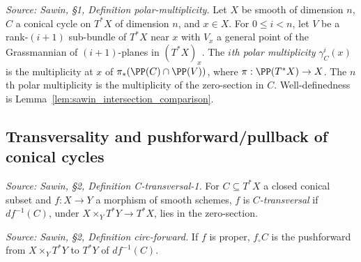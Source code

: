 \begin{definition}
  \label{def:sawin_polar_multiplicity}
  \textit{Source: Sawin, §1, Definition polar-multiplicity.}
  Let $X$ be smooth of dimension $n$, $C$ a conical cycle on $T^*X$ of dimension
  $n$, and $x\in X$.  For $0\le i<n$, let $V$ be a rank-$(i+1)$ sub-bundle of
  $T^*X$ near $x$ with $V_x$ a general point of the Grassmannian of
  $(i+1)$-planes in $(T^*X)_x$.  The \emph{$i$th polar multiplicity}
  $\gamma^i_C(x)$ is the multiplicity at $x$ of $\pi_*(\PP(C)\cap\PP(V))$, where
  $\pi:\PP(T^*X)\to X$.  The $n$th polar multiplicity is the multiplicity of the
  zero-section in $C$.  Well-definedness is Lemma~\ref{lem:sawin_intersection_comparison}.
\end{definition}

\subsection{Transversality and pushforward/pullback of conical cycles}

\begin{definition}
  \label{def:sawin_C_transversal_map}
  \textit{Source: Sawin, §2, Definition C-transversal-1.}
  For $C\subseteq T^*X$ a closed conical subset and $f:X\to Y$ a morphism of
  smooth schemes, $f$ is \emph{$C$-transversal} if $df^{-1}(C)$, under
  $X\times_Y T^*Y \to T^*X$, lies in the zero-section.
\end{definition}

\begin{definition}
  \label{def:sawin_circ_forward}
  \textit{Source: Sawin, §2, Definition circ-forward.}
  If $f$ is proper, $f_\circ C$ is the pushforward from $X\times_Y T^*Y$ to
  $T^*Y$ of $df^{-1}(C)$.
\end{definition}

